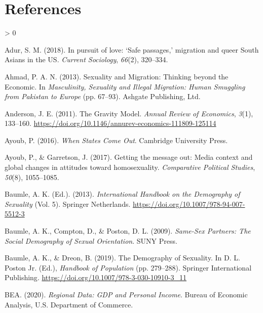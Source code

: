 \documentclass[
  11pt,
]{article}
\newlength{\cslhangindent}
\newenvironment{CSLReferences}[2] %
 {%
  \setlength{\parindent}{0pt}
  \ifodd #1 \everypar{\setlength{\hangindent}{\cslhangindent}}\ignorespaces\fi
  \ifnum #2 > 0
  \setlength{\parskip}{#2\baselineskip}
  \fi
 }%
 {}
\begin{document}
\hypertarget{references}{%
\section{References}\label{references}}

\setlength{\parindent}{-0.2in}
\setlength{\leftskip}{0.2in}
\setlength{\parskip}{8pt}

\noindent

\hypertarget{refs}{}
\begin{CSLReferences}{1}{0}
\leavevmode\hypertarget{ref-adur_2018}{}%
Adur, S. M. (2018). In pursuit of love: {`{Safe} passages,'} migration and queer {South Asians} in the {US}. \emph{Current Sociology}, \emph{66}(2), 320--334.

\leavevmode\hypertarget{ref-ahmad_2013}{}%
Ahmad, P. A. N. (2013). Sexuality and {Migration}: {Thinking} beyond the {Economic}. In \emph{Masculinity, {Sexuality} and {Illegal Migration}: {Human Smuggling} from {Pakistan} to {Europe}} (pp. 67--93). {Ashgate Publishing, Ltd.}

\leavevmode\hypertarget{ref-anderson_2011}{}%
Anderson, J. E. (2011). The {Gravity Model}. \emph{Annual Review of Economics}, \emph{3}(1), 133--160. \url{https://doi.org/10.1146/annurev-economics-111809-125114}

\leavevmode\hypertarget{ref-ayoub_2016}{}%
Ayoub, P. (2016). \emph{When {States Come Out}}. {Cambridge University Press}.

\leavevmode\hypertarget{ref-ayoub_2017}{}%
Ayoub, P., \& Garretson, J. (2017). Getting the message out: {Media} context and global changes in attitudes toward homosexuality. \emph{Comparative Political Studies}, \emph{50}(8), 1055--1085.

\leavevmode\hypertarget{ref-baumle_2013}{}%
Baumle, A. K. (Ed.). (2013). \emph{International {Handbook} on the {Demography} of {Sexuality}} (Vol. 5). {Springer Netherlands}. \url{https://doi.org/10.1007/978-94-007-5512-3}

\leavevmode\hypertarget{ref-baumle_2009}{}%
Baumle, A. K., Compton, D., \& Poston, D. L. (2009). \emph{Same-{Sex Partners}: {The Social Demography} of {Sexual Orientation}}. {SUNY Press}.

\leavevmode\hypertarget{ref-baumle_2019}{}%
Baumle, A. K., \& Dreon, B. (2019). The {Demography} of {Sexuality}. In D. L. Poston Jr. (Ed.), \emph{Handbook of {Population}} (pp. 279--288). {Springer International Publishing}. \url{https://doi.org/10.1007/978-3-030-10910-3_11}

\leavevmode\hypertarget{ref-bea_2020}{}%
BEA. (2020). \emph{Regional {Data}: {GDP} and {Personal Income}}. {Bureau of Economic Analysis, U.S. Department of Commerce}.


\end{CSLReferences}
\end{document}
